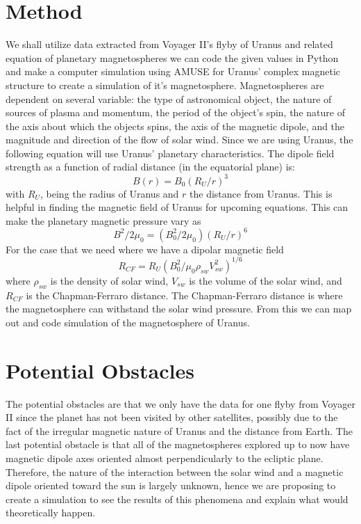 \documentclass[%
 reprint,
 amsmath,amssymb,
 aps,
]{revtex4-1}
\begin{document}
\section{\label{sec:level2}Method}

We shall utilize data extracted from Voyager II's flyby of Uranus and related equation of planetary magnetospheres we can code the given values in Python and make a computer simulation using AMUSE for Uranus' complex magnetic structure to create a simulation of it's magnetosphere. Magnetospheres are dependent on several variable: the type of astronomical object, the nature of sources of plasma and momentum, the period of the object's spin, the nature of the axis about which the objects spins, the axis of the magnetic dipole, and the magnitude and direction of the flow of solar wind. Since we are using Uranus, the following equation will use Uranus' planetary characteristics. The dipole field strength as a function of radial distance (in the equatorial plane) is: \[ B(r)=B_0(R_U/r)^3 \] with $R_U$, being the radius of Uranus and $r$ the distance from Uranus. This is helpful in finding the magnetic field of Uranus for upcoming equations. This can make the planetary magnetic pressure vary as \[B^2/2\mu_0=(B^2_0/2\mu_0)(R_U/r)^6\] For the case that we need where we have a dipolar magnetic field \[ R_{CF}=R_U(B^2_0/\mu_0\rho_{sw}V^2_{sw})^{1/6}\] where $\rho_{sw}$ is the density of solar wind, $V_{sw}$ is the volume of the solar wind, and $R_{CF}$ is the Chapman-Ferraro distance. The Chapman-Ferraro distance is where the magnetosphere can withstand the solar wind pressure. From this we can map out and code simulation of the magnetosphere of Uranus.

\section{\label{sec:level3}Potential Obstacles}

The potential obstacles are that we only have the data for one flyby from Voyager II since the planet has not been visited by other satellites, possibly due to the fact of the irregular magnetic nature of Uranus and the distance from Earth. The last potential obstacle is that all of the magnetospheres explored up to now have magnetic dipole axes oriented almost perpendicularly to the ecliptic plane. Therefore, the nature of the interaction between the solar wind and a magnetic dipole oriented toward the sun is largely unknown, hence we are proposing to create a simulation to see the results of this phenomena and explain what would theoretically happen. 
\end{document}
